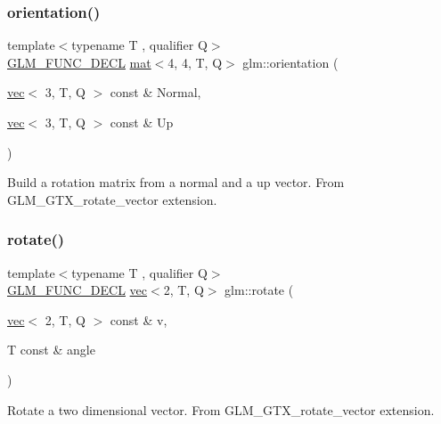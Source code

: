 \subsubsection{\texorpdfstring{orientation()}{orientation()}}
{\footnotesize\ttfamily template$<$typename T , qualifier Q$>$ \\
\hyperlink{setup_8hpp_ab2d052de21a70539923e9bcbf6e83a51}{G\+L\+M\+\_\+\+F\+U\+N\+C\+\_\+\+D\+E\+CL} \hyperlink{structglm_1_1mat}{mat}$<$4, 4, T, Q$>$ glm\+::orientation (\begin{DoxyParamCaption}\item[{\hyperlink{structglm_1_1vec}{vec}$<$ 3, T, Q $>$ const \&}]{Normal,  }\item[{\hyperlink{structglm_1_1vec}{vec}$<$ 3, T, Q $>$ const \&}]{Up }\end{DoxyParamCaption})}

Build a rotation matrix from a normal and a up vector. From G\+L\+M\+\_\+\+G\+T\+X\+\_\+rotate\+\_\+vector extension. \mbox{\label{group__gtx__rotate__vector_gab64a67b52ff4f86c3ba16595a5a25af6}} 
\subsubsection{\texorpdfstring{rotate()}{rotate()}\hspace{0.1cm}{\footnotesize\ttfamily [1/3]}}
{\footnotesize\ttfamily template$<$typename T , qualifier Q$>$ \\
\hyperlink{setup_8hpp_ab2d052de21a70539923e9bcbf6e83a51}{G\+L\+M\+\_\+\+F\+U\+N\+C\+\_\+\+D\+E\+CL} \hyperlink{structglm_1_1vec}{vec}$<$2, T, Q$>$ glm\+::rotate (\begin{DoxyParamCaption}\item[{\hyperlink{structglm_1_1vec}{vec}$<$ 2, T, Q $>$ const \&}]{v,  }\item[{T const \&}]{angle }\end{DoxyParamCaption})}

Rotate a two dimensional vector. From G\+L\+M\+\_\+\+G\+T\+X\+\_\+rotate\+\_\+vector extension. \mbox{\label{group__gtx__rotate__vector_ga1ba501ef83d1a009a17ac774cc560f21}} 
